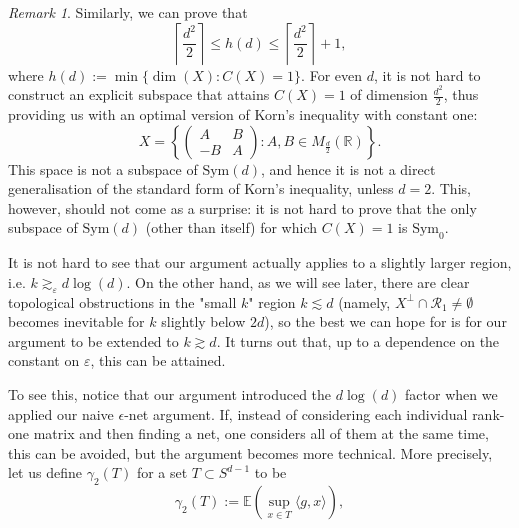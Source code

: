 \documentclass[11pt, a4paper, reqno]{elsarticle}
\theoremstyle{definition}
\theoremstyle{remark}
\newtheorem{remark}{Remark}
\begin{document}
\begin{remark}
     Similarly, we can prove that
      \begin{equation*}
        \left\lceil \frac{d^2}2\right\rceil\le   h(d)\le \left\lceil \frac{d^2}2\right\rceil+1,
      \end{equation*}
      where $h(d):=\min\{\dim(X)\colon  C(X)=1\}.$ For even
      $d$, it is not hard to construct
      an explicit subspace that attains $C(X)=1$ of dimension $\frac{d^2}2$, thus providing us
      with an optimal version of Korn's inequality with constant one:
      \begin{equation*}
          X=\left\{\begin{pmatrix}A&B\\
          -B&A\end{pmatrix}\colon A,B\in M_{\frac d2}(\mathbb{R})\right\}.
      \end{equation*}
      This space is not a subspace of $\mathrm{Sym}(d)$,
      and hence it is not a direct generalisation
      of the standard form of Korn's inequality, unless
      $d=2$. This, however, should not come as a surprise: it is not hard to prove that the only                                               
      subspace of $\mathrm{Sym}(d)$ (other than itself)
      for which $C(X)=1$ is $\mathrm{Sym}_0$.
\end{remark}
        It is not hard to see that our argument actually applies to a slightly
        larger region, i.e. $k\gtrsim_\varepsilon d\log(d)$. On the other
        hand, as we will see later, there are clear topological obstructions
        in the "small $k$" region $k\lesssim d$ (namely, $X^\perp \cap \mathcal R_1\neq \emptyset$
        becomes inevitable for $k$ slightly below $2d$), so the best we
        can hope for is for our argument to be extended to $k\gtrsim d$.
        It turns out that, up to a dependence on the constant on $\varepsilon$, this can be attained.\par
        To see this, notice that our argument introduced the $d\log(d)$ factor when we applied our naive
        $\epsilon$-net argument. If, instead of considering each individual rank-one matrix and then 
        finding a net, one considers all of them at the same time, this can be avoided, but the argument
        becomes more technical. More precisely, let us define $\gamma_2(T)$ for a set $T\subset S^{d-1}$
        to be
        \begin{equation*}
            \gamma_2(T):=\mathbb E\left(\sup_{x\in T} \langle g, x\rangle\right),
        \end{equation*}
\end{document}

